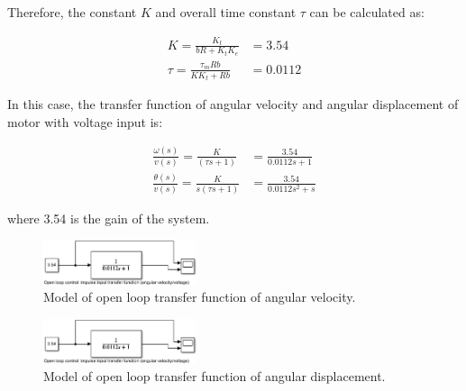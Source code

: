 \documentclass[conference]{IEEEtran}
\begin{document}
Therefore, the constant $K$ and overall time constant $\tau$ can be calculated as:

\begin{align}
    K = \frac{K_t}{bR + K_t K_e} &= 3.54\\ 
    \tau = \frac{\tau_m Rb}{K K_t + Rb} &= 0.0112
\end{align}

In this case, the transfer function of angular velocity and angular displacement of motor with voltage input is:

\begin{align}
    \frac{\omega (s)}{v(s)} = \frac{K}{(\tau s +1)} &= \frac{3.54}{0.0112s + 1}\\
    \frac{\theta (s)}{v(s)} = \frac{K}{s(\tau s + 1)} &= \frac{3.54}{0.0112s^2 + s}
\end{align}

where 3.54 is the gain of the system.

\begin{figure}[htbp]
    \centerline{\includegraphics[width = 0.4\textwidth]{../img/q1-2.png}}
    \caption{Model of open loop transfer function of angular velocity.}
\end{figure}

\begin{figure}[htbp]
    \centerline{\includegraphics[width = 0.4\textwidth]{../img/q1-2.png}}
    \caption{Model of open loop transfer function of angular displacement.}
\end{figure}
\end{document}
